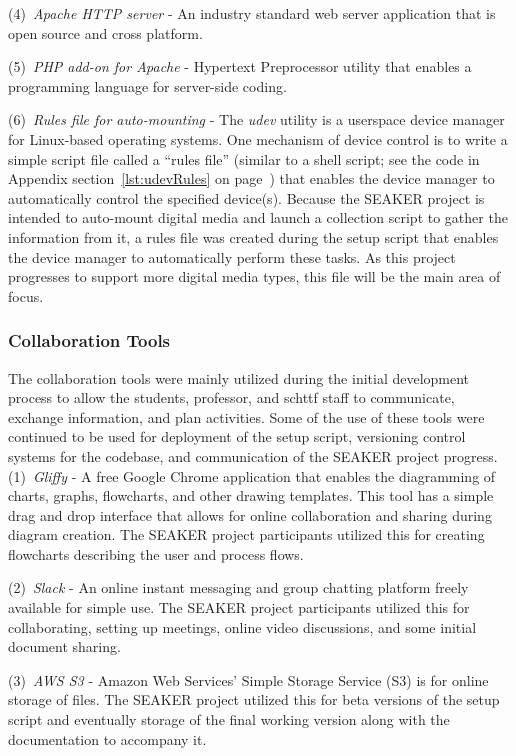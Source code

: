 \documentclass[12pt]{article}
\begin{document}
(4)~{\em Apache HTTP server} - An industry standard web
server application that is open source and cross platform.

(5)~{\em PHP add-on for Apache} - Hypertext Preprocessor utility
that enables a programming language for server-side coding.

(6)~{\em Rules file for auto-mounting} - The {\em udev} utility 
is a userspace device manager for Linux-based operating systems. 
One mechanism of device control is to write a simple script file
called a ``rules file''
(similar to a shell script; see the code in Appendix section~\ref{lst:udevRules}
on page~\pageref{lst:udevRules}) that enables the device manager
to automatically control the specified device(s).  Because 
the SEAKER project is intended to auto-mount digital media and
launch a collection script to gather the information
from it, a rules file was created during the setup script
that enables the device manager to automatically perform
these tasks.  As this project progresses to support more
digital media types, this file will be the main area of focus.

\subsubsection{Collaboration Tools}

The collaboration tools were mainly utilized during the initial
development process to allow the students, professor, and \gls{schttf}
staff to communicate, exchange information, and plan activities.  Some
of the use of these tools were continued to be used for deployment of
the setup script, versioning control systems for the codebase, and
communication of the SEAKER project progress.\\

(1)~{\em Gliffy} - A free Google Chrome application that enables the diagramming
of charts, graphs, flowcharts, and other drawing templates.  This tool
has a simple drag and drop interface that allows for online collaboration 
and sharing during diagram creation.  The SEAKER project participants
utilized this for creating flowcharts describing the user and process
flows.

(2)~{\em Slack} - An online instant messaging and group chatting platform
freely available for simple use.  The SEAKER project participants utilized
this for collaborating, setting up meetings, online video discussions, and
some initial document sharing.

(3)~{\em AWS S3} - Amazon Web Services' Simple Storage Service (S3) is for online
storage of files.  The SEAKER project utilized this for beta versions of
the setup script and eventually storage of the final working version along
with the documentation to accompany it.
\end{document}
